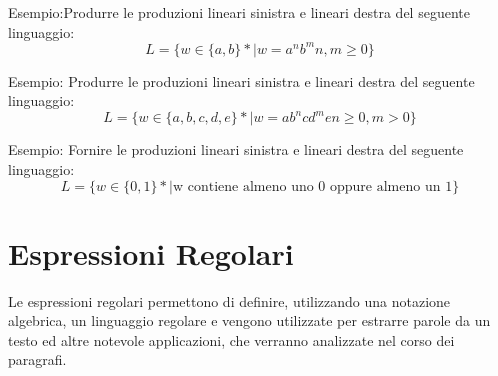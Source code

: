 \documentclass[a4paper]{report}
\theoremstyle{definition}%
\begin{document}
  Esempio:Produrre le produzioni lineari sinistra e lineari destra del seguente linguaggio:
  \begin{equation*}
    L = \{w \in \{a, b\}* | w = a^nb^m n,m \geq 0\}
  \end{equation*}

  Esempio: Produrre le produzioni lineari sinistra e lineari destra del seguente linguaggio:
  \begin{equation*}
    L = \{w \in \{a,b,c,d,e\}* | w = ab^ncd^me n \geq 0, m > 0\}
  \end{equation*}

  Esempio: Fornire le produzioni lineari sinistra e lineari destra del seguente linguaggio:
  \begin{equation*}
    L = \{w \in \{0,1\}* | \text{w contiene almeno uno 0 oppure almeno un 1}\}
  \end{equation*}

  \section{Espressioni Regolari}
  Le espressioni regolari permettono di definire, utilizzando una notazione algebrica, un linguaggio regolare e vengono utilizzate
  per estrarre parole da un testo ed altre notevole applicazioni, che verranno analizzate nel corso dei paragrafi.
\end{document}
